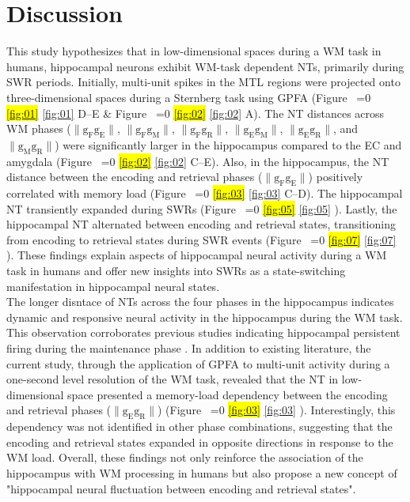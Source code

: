 \documentclass[preprint,review,12pt]{elsarticle}%
\newcommand{\hl}[1]{\colorbox{yellow}{#1}}
\newcommand{\hlref}[1]{%
  \ifnum\getrefnumber{#1}=0
    \hl{\ref*{#1}}%
  \else
    \ref{#1}%
  \fi
}
\begin{document}
\section{Discussion}
This study hypothesizes that in low-dimensional spaces during a WM task in humans, hippocampal neurons exhibit WM-task dependent NTs, primarily during SWR periods. Initially, multi-unit spikes in the MTL regions were projected onto three-dimensional spaces during a Sternberg task using GPFA (Figure~\hlref{fig:01}D--E \& Figure~\hlref{fig:02}A). The NT distances across WM phases ($\mathrm{\lVert g_{F}g_{E} \rVert}$, $\mathrm{\lVert g_{F}g_{M} \rVert}$, $\mathrm{\lVert g_{F}g_{R} \rVert}$, $\mathrm{\lVert g_{E}g_{M} \rVert}$, $\mathrm{\lVert g_{E}g_{R} \rVert}$, and $\mathrm{\lVert g_{M}g_{R} \rVert}$) were significantly larger in the hippocampus compared to the EC and amygdala (Figure~\hlref{fig:02}C--E). Also, in the hippocampus, the NT distance between the encoding and retrieval phases ($\mathrm{\lVert g_{F}g_{E} \rVert}$) positively correlated with memory load (Figure~\hlref{fig:03}C--D). The hippocampal NT transiently expanded during SWRs (Figure~\hlref{fig:05}). Lastly, the hippocampal NT alternated between encoding and retrieval states, transitioning from encoding to retrieval states during SWR events (Figure~\hlref{fig:07}). These findings explain aspects of hippocampal neural activity during a WM task in humans and offer new insights into SWRs as a state-switching manifestation in hippocampal neural states.\\
\indent
The longer disntace of NTs across the four phases in the hippocampus indicates dynamic and responsive neural activity in the hippocampus during the WM task. This observation corroborates previous studies indicating hippocampal persistent firing during the maintenance phase \cite{kaminski_persistently_2017, kornblith_persistent_2017, faraut_dataset_2018, boran_persistent_2019}. In addition to existing literature, the current study, through the application of GPFA to multi-unit activity during a one-second level resolution of the WM task, revealed that the NT in low-dimensional space presented a memory-load dependency between the encoding and retrieval phases ($\mathrm{\lVert g_{E}g_{R} \rVert}$) (Figure~\hlref{fig:03}). Interestingly, this dependency was not identified in other phase combinations, suggesting that the encoding and retrieval states expanded in opposite directions in response to the WM load. Overall, these findings not only reinforce the association of the hippocampus with WM processing in humans but also propose a new concept of "hippocampal neural fluctuation between encoding and retrieval states".\\
\end{document}
